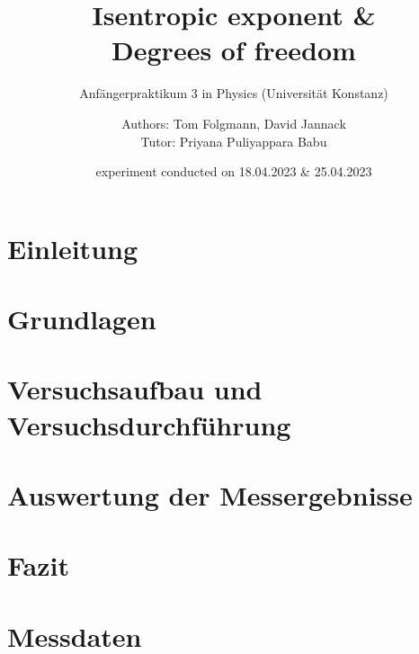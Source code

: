 \documentclass[oneside, footinclude=off, captions=tableheading, DIV=12;usenames,dvipsnames]{scrartcl}
\begin{document}
    \title{Isentropic exponent \& \\ Degrees of freedom}
    \subtitle{Anfängerpraktikum 3 in Physics (Universität Konstanz)}
    \author{Authors: Tom Folgmann, David Jannack \\ \large{Tutor: Priyana Puliyappara Babu}}
    \date{experiment conducted on 18.04.2023 \& 25.04.2023}
    \maketitle
    \thispagestyle{empty}
    \section*{Einleitung}
        

    \newpage


    \tableofcontents
    \thispagestyle{empty}	
    \newpage
    \setcounter{page}{1}


\newpage
\section{Grundlagen}
    
    
	

\newpage
\section{Versuchsaufbau und Versuchsdurchführung}
    

\newpage
\section{Auswertung der Messergebnisse}
    

\newpage
\section{Fazit}
    


\newpage
    
\newpage
    \listoffigures
    \listoftables


\newpage
    \section*{Messdaten}
    
\newpage
    



%
\end{document}
